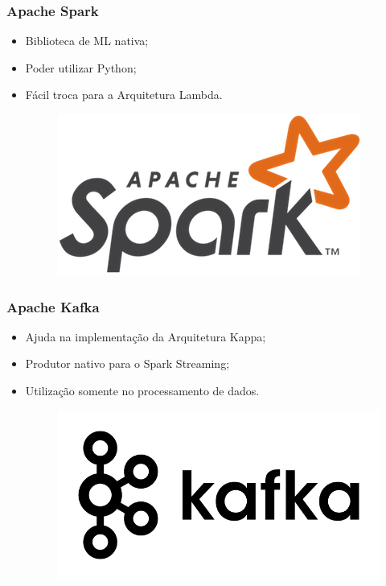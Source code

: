 \documentclass{beamer}
\begin{document}
  \begin{frame}
      \frametitle{Apache Spark}
      \begin{itemize}
          \item Biblioteca de ML nativa;
          \item Poder utilizar Python;
          \item Fácil troca para a Arquitetura Lambda.
              \begin{figure}
                  \includegraphics[scale=0.3]{figures/spark_logo.png}
              \end{figure}
      \end{itemize}
  \end{frame}

  \begin{frame}
      \frametitle{Apache Kafka}
      \begin{itemize}
          \item Ajuda na implementação da Arquitetura Kappa;
          \item Produtor nativo para o Spark Streaming;
          \item Utilização somente no processamento de dados.
              \begin{figure}
                  \includegraphics[scale=0.3]{figures/kafka_logo.png}
              \end{figure}
      \end{itemize}
  \end{frame}
\end{document}
